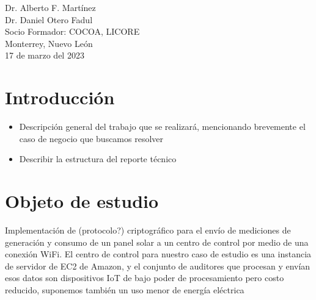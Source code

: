 \documentclass{article}
\begin{document}
\begin{titlepage}
\begin{center}
\begin{table}[h!]
\begin{tabular}{ ||c|c|| }
                    \hline
                \end{tabular}
            \end{table}
            \vspace{0.7cm}
            \large 	Dr. Alberto F. Martínez \\ %
            \vspace{0.2cm}
            \large 	Dr. Daniel Otero Fadul\\ %
            \vspace{0.2cm}
            \large Socio Formador: COCOA, LICORE \\
            \vspace{0.2cm}
            \large Monterrey, Nuevo León \\
            \vspace{0.2cm}
            \large 17 de marzo del 2023 \\
            \vspace{1cm}
        \end{center}
    \end{titlepage}

    \tableofcontents
    \listoffigures
    \listoftables
    \clearpage
    \renewcommand{\tablename}{Tabla}

    \section{Introducción}

        \begin{itemize}
            \item Descripción general del trabajo que se realizará, mencionando brevemente el caso de negocio que buscamos resolver
            \item Describir la estructura del reporte técnico
        \end{itemize}

    \section{Objeto de estudio}

        Implementación de (protocolo?) criptográfico para el envío de mediciones de generación y consumo de un panel solar a un centro de control por medio de una conexión WiFi. El centro de control para nuestro caso de estudio es una instancia de servidor de EC2 de Amazon, y el conjunto de auditores que procesan y envían esos datos son dispositivos IoT de bajo poder de procesamiento pero costo reducido, suponemos también un uso menor de energía eléctrica
\end{document}
